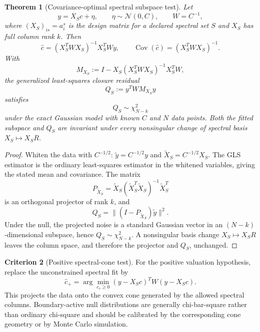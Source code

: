 \documentclass[11pt,a4paper]{article}
\numberwithin{equation}{section}
\theoremstyle{definition}
\newtheorem{criterion}{Criterion}
\theoremstyle{plain}
\newtheorem{theorem}[criterion]{Theorem}
\theoremstyle{remark}
\begin{document}
\begin{theorem}[Covariance-optimal spectral subspace test]
Let
\begin{equation}
y=X_Sc+\eta,
\qquad
\eta\sim\mathcal N(0,C),
\qquad
W=C^{-1},
\end{equation}
where \((X_S)_{is}=a_i^s\) is the design matrix for a declared spectral set \(S\) and \(X_S\) has full column rank \(k\). Then
\begin{equation}
\boxed{
\widehat c=(X_S^TWX_S)^{-1}X_S^TWy,
\qquad
\operatorname{Cov}(\widehat c)=(X_S^TWX_S)^{-1}.
}
\end{equation}
With
\begin{equation}
M_{X_S}:=I-X_S(X_S^TWX_S)^{-1}X_S^TW,
\end{equation}
the generalized least-squares closure residual
\begin{equation}
\boxed{Q_S:=y^TWM_{X_S}y}
\end{equation}
satisfies
\begin{equation}
Q_S\sim\chi^2_{N-k}
\end{equation}
under the exact Gaussian model with known \(C\) and \(N\) data points. Both the fitted subspace and \(Q_S\) are invariant under every nonsingular change of spectral basis \(X_S\mapsto X_SR\).
\end{theorem}
\begin{proof}
Whiten the data with \(C^{-1/2}\):
\(\widetilde y=C^{-1/2}y\) and
\(\widetilde X_S=C^{-1/2}X_S\).
The GLS estimator is the ordinary least-squares estimator in the whitened
variables, giving the stated mean and covariance. The matrix
\begin{equation}
P_{\widetilde X_S}
=
\widetilde X_S(\widetilde X_S^T\widetilde X_S)^{-1}\widetilde X_S^T
\end{equation}
is an orthogonal projector of rank \(k\), and
\begin{equation}
Q_S
=
\|(I-P_{\widetilde X_S})\widetilde y\|^2.
\end{equation}
Under the null, the projected noise is a standard Gaussian vector in an
\((N-k)\)-dimensional subspace, hence
\(Q_S\sim\chi^2_{N-k}\). A nonsingular basis change
\(X_S\mapsto X_SR\) leaves the column space, and therefore the projector and
\(Q_S\), unchanged.
\end{proof}

\begin{criterion}[Positive spectral-cone test]
For the positive valuation hypothesis, replace the unconstrained spectral fit by
\begin{equation}
\widehat c_+
=\arg\min_{c_s\ge0}(y-X_Sc)^TW(y-X_Sc).
\end{equation}
This projects the data onto the convex cone generated by the allowed spectral columns. Boundary-active null distributions are generally chi-bar-square rather than ordinary chi-square and should be calibrated by the corresponding cone geometry or by Monte Carlo simulation.
\end{criterion}
\end{document}
